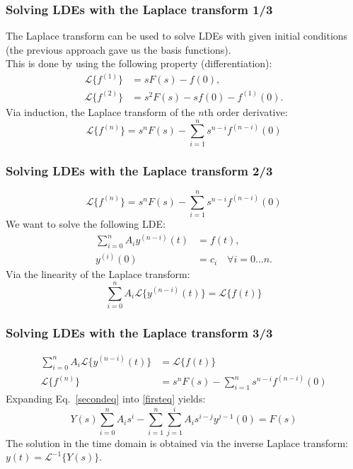 \begin{frame}
\frametitle{Solving LDEs with the Laplace transform 1/3}
The Laplace transform can be used to solve LDEs with given initial conditions 
(the previous approach gave us the basis functions). \\
This is done by using the following property (differentiation):
\begin{align*}
\mathcal{L}\{f^{(1)}\} &= s F(s) - f(0), \\
\mathcal{L}\{f^{(2)}\} &= s^2 F(s) -s f(0) - f^{(1)}(0).
\end{align*}
Via induction, the Laplace transform of the $n$th order derivative:
\begin{equation*}
\mathcal{L}\{f^{(n)}\} = s^n F(s) - \sum_{i=1}^n s^{n-i}f^{(n-i)}(0)
\end{equation*}
\end{frame}

\begin{frame}
\frametitle{Solving LDEs with the Laplace transform 2/3}
\begin{equation*}
\mathcal{L}\{f^{(n)}\} = s^n F(s) - \sum_{i=1}^n s^{n-i}f^{(n-i)}(0)
\end{equation*}
We want to solve the following LDE:
\begin{align*}
\sum_{i=0}^{n} A_i y^{(n-i)}(t) &= f(t), \\
y^{(i)}(0) &= c_i \quad \forall i=0\ldots n.
\end{align*}
Via the linearity of the Laplace transform:
\begin{equation*}
\sum_{i=0}^{n} A_i \mathcal{L}\{y^{(n-i)}(t)\} = \mathcal{L}\{f(t)\} 
\end{equation*}
\end{frame}

\begin{frame}
\frametitle{Solving LDEs with the Laplace transform 3/3}
\begin{align}
\sum_{i=0}^{n} A_i \mathcal{L}\{y^{(n-i)}(t)\} &= \mathcal{L}\{f(t)\}  \label{firsteq} \\
\mathcal{L}\{f^{(n)}\} &= s^n F(s) - \sum_{i=1}^n s^{n-i}f^{(n-i)}(0) \label{secondeq}
\end{align}
Expanding Eq.~\eqref{secondeq} into \eqref{firsteq} yields:
\begin{equation*}
Y(s)\sum_{i=0}^n A_i s^i - \sum_{i=1}^n \sum_{j=1}^i A_i s^{i-j}y^{j-1}(0) = F(s)
\end{equation*}
The solution in the time domain is obtained via the inverse Laplace transform: $y(t) = \mathcal{L}^{-1}\{Y(s)\}$.
\end{frame}


